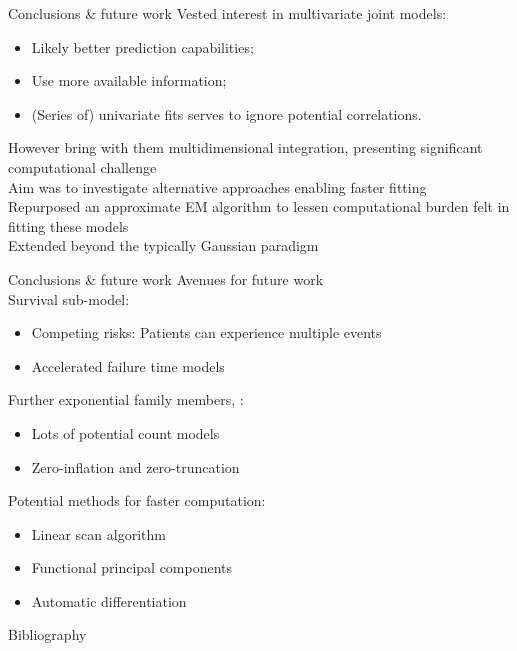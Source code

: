 \documentclass[10pt]{beamer}
\begin{document}
\begin{frame}{Conclusions \& future work}
     Vested interest in multivariate joint models:
     \begin{itemize}
         \item Likely better prediction capabilities;
         \item Use more available information;
         \item (Series of) univariate fits serves to ignore potential correlations.
     \end{itemize}
     However bring with them multidimensional integration, presenting significant computational challenge\\
     \vspace{5mm}
     Aim was to investigate alternative approaches enabling faster fitting\\
     \vspace{5mm}
     Repurposed an approximate EM algorithm to lessen computational burden felt in fitting these models\\
     \vspace{5mm}
     Extended beyond the typically Gaussian paradigm
\end{frame}

\begin{frame}{Conclusions \& future work}
     Avenues for future work\\
     \vspace{5mm}
     Survival sub-model:
     \begin{itemize}
         \item Competing risks: Patients can experience multiple events
         \item Accelerated failure time models
     \end{itemize}
     \vspace{5mm}
     Further exponential family members, \eg:
     \begin{itemize}
         \item Lots of potential count models
         \item Zero-inflation and zero-truncation
     \end{itemize}
     \vspace{5mm}
     Potential methods for faster computation:
     \begin{itemize}
         \item Linear scan algorithm
         \item Functional principal components
         \item Automatic differentiation
     \end{itemize}
     
\end{frame}

\begin{frame}{Bibliography}
    \printbibliography
\end{frame}
\end{document}
